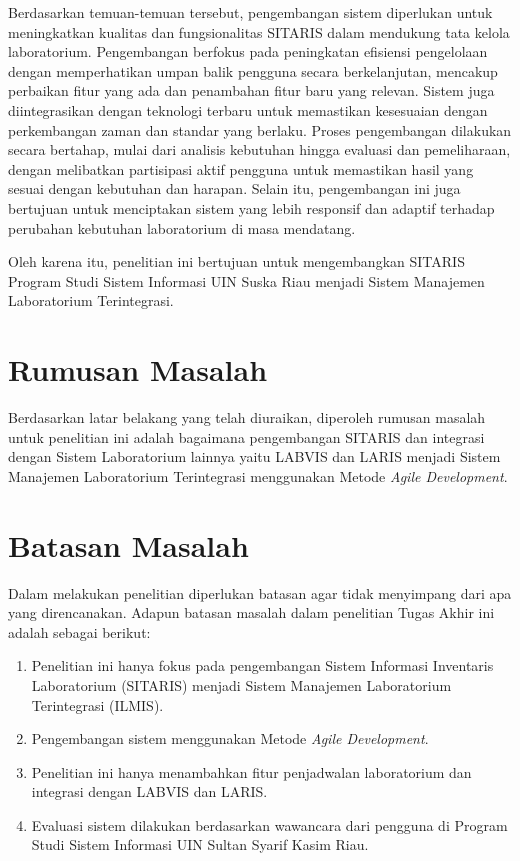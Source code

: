 Berdasarkan temuan-temuan tersebut, pengembangan sistem diperlukan untuk meningkatkan kualitas dan fungsionalitas SITARIS dalam mendukung tata kelola laboratorium. Pengembangan berfokus pada peningkatan efisiensi pengelolaan dengan memperhatikan umpan balik pengguna secara berkelanjutan, mencakup perbaikan fitur yang ada dan penambahan fitur baru yang relevan. Sistem juga diintegrasikan dengan teknologi terbaru untuk memastikan kesesuaian dengan perkembangan zaman dan standar yang berlaku. Proses pengembangan dilakukan secara bertahap, mulai dari analisis kebutuhan hingga evaluasi dan pemeliharaan, dengan melibatkan partisipasi aktif pengguna untuk memastikan hasil yang sesuai dengan kebutuhan dan harapan. Selain itu, pengembangan ini juga bertujuan untuk menciptakan sistem yang lebih responsif dan adaptif terhadap perubahan kebutuhan laboratorium di masa mendatang.

Oleh karena itu, penelitian ini bertujuan untuk mengembangkan SITARIS Program Studi Sistem Informasi UIN Suska Riau menjadi Sistem Manajemen Laboratorium Terintegrasi.
\section{Rumusan Masalah}
Berdasarkan latar belakang yang telah diuraikan, diperoleh rumusan masalah untuk penelitian ini adalah bagaimana pengembangan SITARIS dan integrasi dengan Sistem Laboratorium lainnya yaitu LABVIS dan LARIS menjadi Sistem Manajemen Laboratorium Terintegrasi menggunakan Metode \textit{Agile Development}.

\section{Batasan Masalah}
Dalam melakukan penelitian diperlukan batasan agar tidak menyimpang dari apa yang direncanakan. Adapun batasan masalah dalam penelitian Tugas Akhir ini adalah sebagai berikut:
\begin{enumerate}
	\item Penelitian ini hanya fokus pada pengembangan Sistem Informasi Inventaris Laboratorium (SITARIS) menjadi Sistem Manajemen Laboratorium Terintegrasi (ILMIS).
	\item Pengembangan sistem menggunakan Metode \textit{Agile Development}.
	\item Penelitian ini hanya menambahkan fitur penjadwalan laboratorium dan integrasi dengan LABVIS dan LARIS.
	\item Evaluasi sistem dilakukan berdasarkan wawancara dari pengguna di Program Studi Sistem Informasi UIN Sultan Syarif Kasim Riau.
\end{enumerate}

